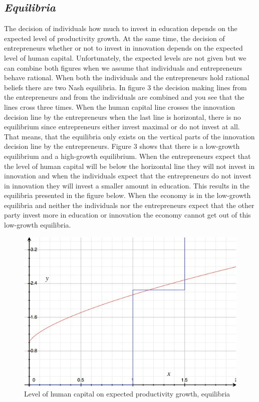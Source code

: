 \documentclass[a4paper,11pt]{article} %
\begin{document}
\subsection{\textit{Equilibria}}
The decision of individuals how much to invest in education depends on the expected level of productivity growth. At the same time, the decision of entrepreneurs whether or not to invest in innovation depends on the expected level of human capital. Unfortunately, the expected levels are not given but we can combine both figures when we assume that individuals and entrepreneurs behave rational. When both the individuals and the entrepreneurs hold rational beliefs there are two Nash equilibria. In figure 3 the decision making lines from the entrepreneurs and from the individuals are combined and you see that the lines cross three times. When the human capital line crosses the innovation decision line by the entrepreneurs when the last line is horizontal, there is no equilibrium since entrepreneurs either invest maximal or do not invest at all. That means, that the equilibria only exists on the vertical parts of the innovation decision line by the entrepreneurs. Figure 3 shows that there is a low-growth equilibrium and a high-growth equilibrium. When the entrepreneurs expect that the level of human capital will be below the horizontal line they will not invest in innovation and when the individuals expect that the entrepreneurs do not invest in innovation they will invest a smaller amount in education. This results in the equilibria presented in the figure below. When the economy is in the low-growth equilibria and neither the individuals nor the entrepreneurs expect that the other party invest more in education or innovation the economy cannot get out of this low-growth equilibria. 

\begin{figure}
  \centering
  \includegraphics{figure3.png}
  \caption{Level of human capital on expected productivity growth, equilibria}
\end{figure}
\end{document}
